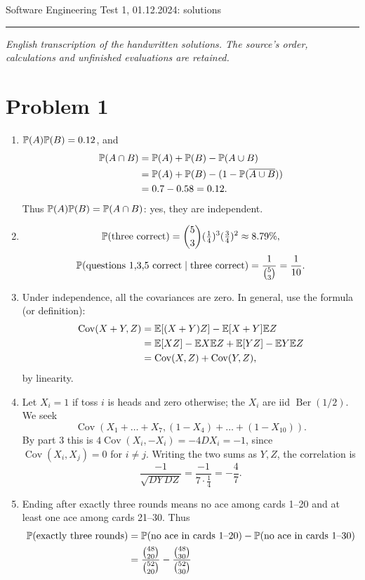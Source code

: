 \documentclass[a4paper]{article}
\begin{document}
\noindent Software Engineering \hfill Test 1, 01.12.2024: solutions
\par\smallskip\hrule\smallskip\noindent
\textit{English transcription of the handwritten solutions. The source's order, calculations and unfinished evaluations are retained.}

\section*{Problem 1}
\begin{enumerate}
\item $\P(A)\P(B)=0.12$, and
\begin{align*}
\P(A\cap B)&=\P(A)+\P(B)-\P(A\cup B)\\
&=\P(A)+\P(B)-(1-\P(\overline{A\cup B}))\\
&=0.7-0.58=0.12.
\end{align*}
Thus $\P(A)\P(B)=\P(A\cap B)$: yes, they are independent.
\item
\[
\P(\text{three correct})=\binom53(\tfrac14)^3(\tfrac34)^2\approx8.79\%,
\]
\[
\P(\text{questions 1,3,5 correct}\mid\text{three correct})
=\frac1{\binom53}=\frac1{10}.
\]
\item Under independence, all the covariances are zero. In general, use the formula (or definition):
\begin{align*}
\operatorname{Cov}(X+Y,Z)
&=\E[(X+Y)Z]-\E[X+Y]\E Z\\
&=\E[XZ]-\E X\E Z+\E[YZ]-\E Y\E Z\\
&=\operatorname{Cov}(X,Z)+\operatorname{Cov}(Y,Z),
\end{align*}
by linearity.
\item Let $X_i=1$ if toss $i$ is heads and zero otherwise; the $X_i$ are iid $\operatorname{Ber}(1/2)$. We seek
\[
\operatorname{Cov}(X_1+\dots+X_7,(1-X_4)+\dots+(1-X_{10})).
\]
By part 3 this is $4\operatorname{Cov}(X_i,-X_i)=-4D X_i=-1$, since $\operatorname{Cov}(X_i,X_j)=0$ for $i\neq j$.
Writing the two sums as $Y,Z$, the correlation is
\[
\frac{-1}{\sqrt{DY\,DZ}}=\frac{-1}{7\cdot\frac14}=-\frac47.
\]
\item Ending after exactly three rounds means no ace among cards 1--20 and at least one ace among cards 21--30. Thus
\begin{align*}
\P(\text{exactly three rounds})
&=\P(\text{no ace in cards 1--20})-\P(\text{no ace in cards 1--30})\\
&=\frac{\binom{48}{20}}{\binom{52}{20}}-\frac{\binom{48}{30}}{\binom{52}{30}}\\

\end{align*}
\end{enumerate}
\end{document}
